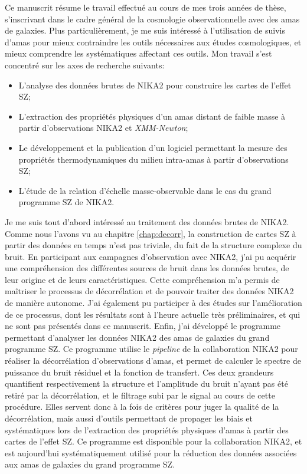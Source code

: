 Ce manuscrit résume le travail effectué au cours de mes trois années de thèse, s'inscrivant dans le cadre général de la cosmologie observationnelle avec des amas de galaxies.
Plus particulièrement, je me suis intéressé à l'utilisation de suivis d'amas pour mieux contraindre les outils nécessaires aux études cosmologiques, et mieux comprendre les systématiques affectant ces outils.
Mon travail s'est concentré sur les axes de recherche suivants:
\begin{itemize}[leftmargin=*]
\setlength\itemsep{0pt}
    \item L'analyse des données brutes de NIKA2 pour construire les cartes de l'effet SZ;
    \item L'extraction des propriétés physiques d'un amas distant de faible masse à partir d'observations NIKA2 et \textit{XMM-Newton};
    \item Le développement et la publication d'un logiciel permettant la mesure des propriétés thermodynamiques du milieu intra-amas à partir d'observations SZ;
    \item L'étude de la relation d'échelle masse-observable dans le cas du grand programme SZ de NIKA2.
\end{itemize}

Je me suis tout d'abord intéressé au traitement des données brutes de NIKA2.
Comme nous l'avons vu au chapitre \ref{chap:decorr}, la construction de cartes SZ à partir des données en temps n'est pas triviale, du fait de la structure complexe du bruit.
En participant aux campagnes d'observation avec NIKA2, j'ai pu acquérir une compréhension des différentes sources de bruit dans les données brutes, de leur origine et de leurs caractéristiques.
Cette compréhension m'a permis de maîtriser le processus de décorrélation et de pouvoir traiter des données NIKA2 de manière autonome.
J'ai également pu participer à des études sur l'amélioration de ce processus, dont les résultats sont à l'heure actuelle très préliminaires, et qui ne sont pas présentés dans ce manuscrit.
Enfin, j'ai développé le programme permettant d'analyser les données NIKA2 des amas de galaxies du grand programme SZ.
Ce programme utilise le \textit{pipeline} de la collaboration NIKA2 pour réaliser la décorrélation d'observations d'amas, et permet de calculer le spectre de puissance du bruit résiduel et la fonction de transfert.
Ces deux grandeurs quantifient respectivement la structure et l'amplitude du bruit n'ayant pas été retiré par la décorrélation, et le filtrage subi par le signal au cours de cette procédure.
Elles servent donc à la fois de critères pour juger la qualité de la décorrélation, mais aussi d'outils permettant de propager les biais et systématiques lors de l'extraction des propriétés physiques d'amas à partir des cartes de l'effet SZ.
Ce programme est disponible pour la collaboration NIKA2, et est aujourd'hui systématiquement utilisé pour la réduction des données associées aux amas de galaxies du grand programme SZ.

